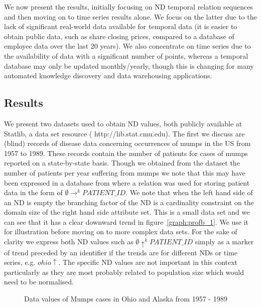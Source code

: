 We now present the results, initially focusing on ND temporal relation
sequences and
then moving on to time series results alone. We focus on the latter
due to the lack of significant real-world data available for temporal
data (it is easier to obtain public data, such as share closing prices,
compared to a database of employee data over the last 20 years). We
also concentrate on time series due to the availability of data with a
significant number of points, whereas a temporal database may only be
updated monthly/yearly, though this is changing for many automated
knowledge discovery and data warehousing applications.


\subsection{Results}\label{subsec:tr_relres}


We present two datasets used to obtain ND values, both publicly
available at Statlib, a data set resource (\ttb
http://lib.stat.cmu.edu\tte). The first we
discuss are (blind) records of disease data concerning occurrences of
mumps in the US from 1957 to 1989. These records contain the number of
patients for cases of mumps reported on a state-by-state
basis. Though we obtained from the dataset the number of patients
per year suffering from mumps we note that this may have been
expressed in a database from where a relation was used for storing
patient data in the form of $\emptyset \to^k PATIENT\_ID$. We note
that when the left hand side of an ND is empty the branching factor of
the ND is a cardinality constraint on the domain size of the right
hand side attribute set. This is a small data set and we can see that
it has a clear downward trend in figure~\ref{graph:profb_1}. We use it for
illustration before moving on to more complex data sets. For the sake
of clarity we express both ND values such as $\emptyset \uparrow^k PATIENT\_ID$
simply as a marker of trend preceded by an identifier if the trends
are for different NDs or time series, e.g. $ohio\uparrow$. The
specific ND values are not important in this context particularly as
they are most probably related to population size which would need to
be normalised.
\medskip

\begin{figure}
\centerline{}
\caption{\label{graph:mumps_ohio_1}{Data values of Mumps
cases in Ohio and Alaska from 1957 - 1989}}
\end{figure}

